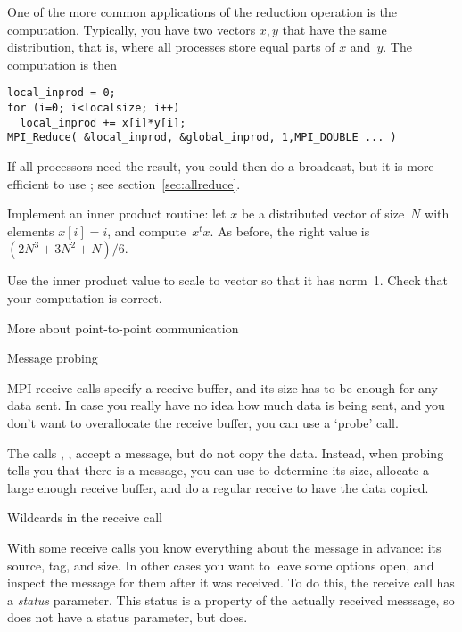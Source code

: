 One of the more common applications of the reduction operation
is the  computation. Typically, you have two vectors $x,y$
that have the same distribution, that is,
where all processes store equal parts of $x$ and~$y$.
The computation is then
\begin{verbatim}
local_inprod = 0;
for (i=0; i<localsize; i++)
  local_inprod += x[i]*y[i];
MPI_Reduce( &local_inprod, &global_inprod, 1,MPI_DOUBLE ... ) 
\end{verbatim}
If all processors need the result, you could then do a broadcast,
but it is more efficient to use ; 
see section~\ref{sec:allreduce}.

\begin{exercise}
  \label{ex:inproduct}
  Implement an inner product routine: let $x$ be a
  distributed vector of size~$N$ with elements $x[i]=i$,
  and compute~$x^tx$.
  As before, the right value is $(2N^3+3N^2+N)/6$.

  Use the inner product value to scale to vector so that it has
  norm~1.
  Check that your computation is correct.
\end{exercise}





 {More about point-to-point communication}

 {Message probing}

MPI receive calls specify a receive buffer, and its size has to be
enough for any data sent. In case you really have no idea how much data
is being sent, and you don't want to overallocate the receive buffer,
you can use a `probe' call.

The calls , , accept a message,
but do not copy the data. Instead, when probing tells you that there is a
message, you can use  to determine its size,
allocate a large enough receive buffer, and do a regular receive to
have the data copied.

 {Wildcards in the receive call}

With some receive calls you know everything about the message in advance:
its source, tag, and size. In other cases you want to leave some options
open, and inspect the message for them after it was received.
To do this, the receive call has a \emph{status}
parameter.
This status is a property of the actually received messsage, so 
does not have a status parameter, but  does.

